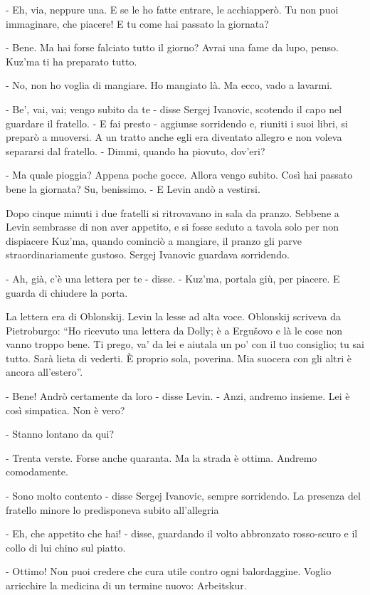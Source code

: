 - Eh, via, neppure una. E se le ho fatte entrare, le acchiapperò. Tu non puoi immaginare, che piacere! E tu come hai passato la giornata? 

- Bene. Ma hai forse falciato tutto il giorno? Avrai una fame da lupo, penso. Kuz'ma ti ha preparato tutto. 

- No, non ho voglia di mangiare. Ho mangiato là. Ma ecco, vado a lavarmi. 

- Be', vai, vai; vengo subito da te - disse Sergej Ivanovic, scotendo il capo nel guardare il fratello. - E fai presto - aggiunse sorridendo e, riuniti i suoi libri, si preparò a muoversi. A un tratto anche egli era diventato allegro e non voleva separarsi dal fratello. - Dimmi, quando ha piovuto, dov'eri? 

- Ma quale pioggia? Appena poche gocce. Allora vengo subito. Così hai passato bene la giornata? Su, benissimo. - E Levin andò a vestirsi. 

Dopo cinque minuti i due fratelli si ritrovavano in sala da pranzo. Sebbene a Levin sembrasse di non aver appetito, e si fosse seduto a tavola solo per non dispiacere Kuz'ma, quando cominciò a mangiare, il pranzo gli parve straordinariamente gustoso. Sergej Ivanovic guardava sorridendo. 

- Ah, già, c'è una lettera per te - disse. - Kuz'ma, portala giù, per piacere. E guarda di chiudere la porta. 

La lettera era di Oblonskij. Levin la lesse ad alta voce. Oblonskij scriveva da Pietroburgo: ``Ho ricevuto una lettera da Dolly; è a Ergušovo e là le cose non vanno troppo bene. Ti prego, va' da lei e aiutala un po' con il tuo consiglio; tu sai tutto. Sarà lieta di vederti. È proprio sola, poverina. Mia suocera con gli altri è ancora all'estero''. 

- Bene! Andrò certamente da loro - disse Levin. - Anzi, andremo insieme. Lei è così simpatica. Non è vero? 

- Stanno lontano da qui? 

- Trenta verste. Forse anche quaranta. Ma la strada è ottima. Andremo comodamente. 

- Sono molto contento - disse Sergej Ivanovic, sempre sorridendo. La presenza del fratello minore lo predisponeva subito all'allegria 

- Eh, che appetito che hai! - disse, guardando il volto abbronzato rosso-scuro e il collo di lui chino sul piatto. 

- Ottimo! Non puoi credere che cura utile contro ogni balordaggine. Voglio arricchire la medicina di un termine nuovo: Arbeitskur. 

